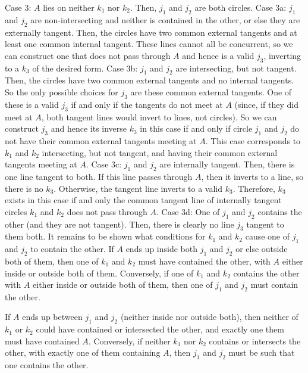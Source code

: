 \begin{mdsoln}
Case 3: $A$ lies on neither $k_1$ nor $k_2$.
Then, $j_1$ and $j_2$ are both circles.
Case 3a: $j_1$ and $j_2$ are non-intersecting and neither is contained in the other, or else they are externally tangent.
Then, the circles have two common external tangents and at least one common internal tangent. These lines cannot all be concurrent, so we can construct one that does not pass through $A$ and hence is a valid $j_3$, inverting to a $k_3$ of the desired form.
Case 3b: $j_1$ and $j_2$ are intersecting, but not tangent.
Then, the circles have two common external tangents and no internal tangents. So the only possible choices for $j_3$ are these common external tangents. One of these is a valid $j_3$ if and only if the tangents do not meet at $A$ (since, if they did meet at $A$, both tangent lines would invert to lines, not circles). So we can construct $j_3$ and hence its inverse $k_3$ in this case if and only if circle $j_1$ and $j_2$ do not have their common external tangents meeting at $A$. This case corresponds to $k_1$ and $k_2$ intersecting, but not tangent, and having their common external tangents meeting at $A$.
Case 3c: $j_1$ and $j_2$ are internally tangent.
Then, there is one line tangent to both. If this line passes through $A$, then it inverts to a line, so there is no $k_3$. Otherwise, the tangent line inverts to a valid $k_3$. Therefore, $k_3$ exists in this case if and only the common tangent line of internally tangent circles $k_1$ and $k_2$ does not pass through $A$.
Case 3d: One of $j_1$ and $j_2$ contains the other (and they are not tangent).
Then, there is clearly no line $j_3$ tangent to them both. It remains to be shown what conditions for $k_1$ and $k_2$ cause one of $j_1$ and $j_2$ to contain the other. If $A$ ends up inside both $j_1$ and $j_2$ or else outside both of them, then one of $k_1$ and $k_2$ must have contained the other, with $A$ either inside or outside both of them. Conversely, if one of $k_1$ and $k_2$ contains the other with $A$ either inside or outside both of them, then one of $j_1$ and $j_2$ must contain the other.

If $A$ ends up between $j_1$ and $j_2$ (neither inside nor outside both), then neither of $k_1$ or $k_2$ could have contained or intersected the other, and exactly one them must have contained $A$. Conversely, if neither $k_1$ nor $k_2$ contains or intersects the other, with exactly one of them containing $A$, then $j_1$ and $j_2$ must be such that one contains the other.



\end{mdsoln}

